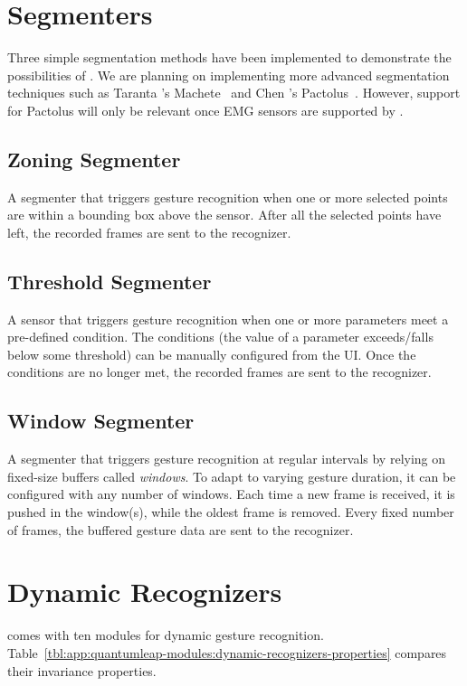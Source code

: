 \section{Segmenters} \label{app:quantumleap-modules:segmenters}
Three simple segmentation methods have been implemented to demonstrate the possibilities of \ql. We are planning on implementing more advanced segmentation techniques such as Taranta \etal's Machete~\cite{Taranta:2021} and Chen \etal's Pactolus~\cite{Chen:2016}. However, support for Pactolus will only be relevant once EMG sensors are supported by \ql.

\subsection{Zoning Segmenter}
A segmenter that triggers gesture recognition when one or more selected points are within a bounding box above the sensor. After all the selected points have left, the recorded frames are sent to the recognizer.

\subsection{Threshold Segmenter}
A sensor that triggers gesture recognition when one or more parameters meet a pre-defined condition. The conditions (\eg the value of a parameter exceeds/falls below some threshold) can be manually configured from the UI. Once the conditions are no longer met, the recorded frames are sent to the recognizer.

\subsection{Window Segmenter}
A segmenter that triggers gesture recognition at regular intervals by relying on fixed-size buffers called \textit{windows}. To adapt to varying gesture duration, it can be configured with any number of windows. Each time a new frame is received, it is pushed in the window(s), while the oldest frame is removed. Every fixed number of frames, the buffered gesture data are sent to the recognizer.

\section{Dynamic Recognizers} \label{app:quantumleap-modules:dynamic-recognizers}
\ql comes with ten modules for dynamic gesture recognition. Table~\ref{tbl:app:quantumleap-modules:dynamic-recognizers-properties} compares their invariance properties.

